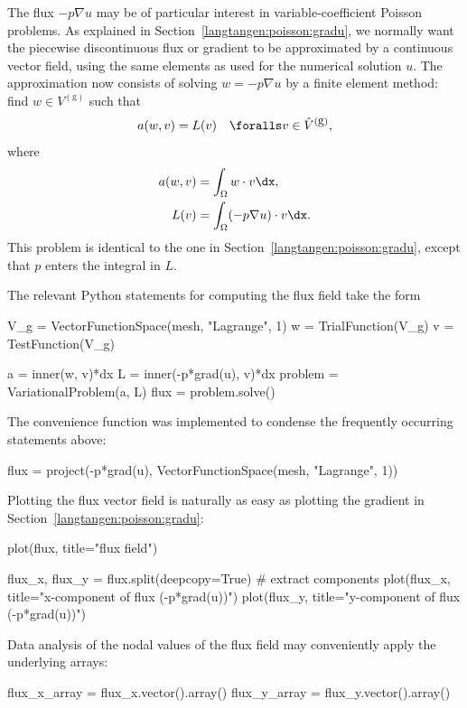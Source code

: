 The flux $-p\nabla u$ may be of particular interest in
variable-coefficient Poisson problems. As explained in
Section~\ref{langtangen:poisson:gradu}, we normally want the piecewise
discontinuous flux or gradient to be approximated by a continuous
vector field, using the same elements as used for the numerical
solution $u$. The approximation now consists of solving $w = -p\nabla
u$ by a finite element method: find $w\in V^{(\mbox{g})}$ such that
\begin{equation}
a(w, v) = L(v)\quad\foralls v\in \hat{V}^{(\mbox{g})},
\end{equation}
where
\begin{align}
a(w, v) &= \int_\Omega w\cdot v\dx,
\\
L(v) &= \int_\Omega (-p \nabla u)\cdot v\dx.
\end{align}
This problem is identical to the one in Section~\ref{langtangen:poisson:gradu},
except that $p$ enters the integral in $L$.

The relevant Python statements for computing the flux field take the form
\begin{python}
V_g = VectorFunctionSpace(mesh, "Lagrange", 1)
w = TrialFunction(V_g)
v = TestFunction(V_g)

a = inner(w, v)*dx
L = inner(-p*grad(u), v)*dx
problem = VariationalProblem(a, L)
flux = problem.solve()
\end{python}
The convenience function  was implemented
to condense the frequently
occurring statements above:
\begin{python}
flux = project(-p*grad(u),
               VectorFunctionSpace(mesh, "Lagrange", 1))
\end{python}

Plotting the flux vector field is naturally as easy as plotting
the gradient in Section~\ref{langtangen:poisson:gradu}:
\begin{python}
plot(flux, title="flux field")

flux_x, flux_y = flux.split(deepcopy=True)  # extract components
plot(flux_x, title="x-component of flux (-p*grad(u))")
plot(flux_y, title="y-component of flux (-p*grad(u))")
\end{python}

Data analysis of the nodal values of the flux field may conveniently
apply the underlying  arrays:
\begin{python}
flux_x_array = flux_x.vector().array()
flux_y_array = flux_y.vector().array()
\end{python}

